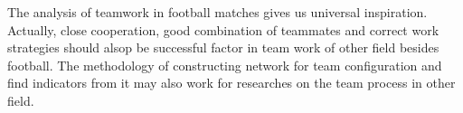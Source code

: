 \documentclass[12pt]{article}
\begin{document}
The analysis of teamwork in football matches gives us universal inspiration. Actually, close cooperation, good combination of teammates and correct work strategies should alsop be successful factor in team work of other field besides football. The methodology of constructing network for team configuration and find indicators from it may also work for researches on the team process in other field.


\end{document}
